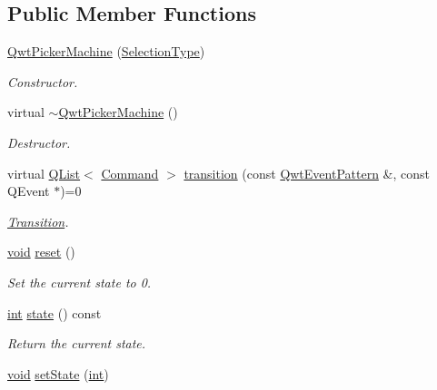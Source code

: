 \subsection*{Public Member Functions}
\begin{DoxyCompactItemize}
\item 
\hyperlink{class_qwt_picker_machine_ab27bc3f70d48aa145db9ebbfdba34e15}{Qwt\-Picker\-Machine} (\hyperlink{class_qwt_picker_machine_a24a9faf12cfa5746eee839a2c0bb937d}{Selection\-Type})
\begin{DoxyCompactList}\small\item\em Constructor. \end{DoxyCompactList}\item 
virtual \hyperlink{class_qwt_picker_machine_aa1164dfb8ae6ac62fb3b6cb19efcb3e5}{$\sim$\-Qwt\-Picker\-Machine} ()
\begin{DoxyCompactList}\small\item\em Destructor. \end{DoxyCompactList}\item 
virtual \hyperlink{class_q_list}{Q\-List}$<$ \hyperlink{class_qwt_picker_machine_a3a8d3d4c107ce5f8351e4cbdd38c43f7}{Command} $>$ \hyperlink{class_qwt_picker_machine_acf7b57003bec437ce1ecf83e6d544968}{transition} (const \hyperlink{class_qwt_event_pattern}{Qwt\-Event\-Pattern} \&, const Q\-Event $\ast$)=0
\begin{DoxyCompactList}\small\item\em \hyperlink{class_transition}{Transition}. \end{DoxyCompactList}\item 
\hyperlink{group___u_a_v_objects_plugin_ga444cf2ff3f0ecbe028adce838d373f5c}{void} \hyperlink{class_qwt_picker_machine_ace6daa55324a8daab3839cf8ba677a93}{reset} ()
\begin{DoxyCompactList}\small\item\em Set the current state to 0. \end{DoxyCompactList}\item 
\hyperlink{ioapi_8h_a787fa3cf048117ba7123753c1e74fcd6}{int} \hyperlink{class_qwt_picker_machine_a9060b1036ef5125968fc7030681d73c0}{state} () const 
\begin{DoxyCompactList}\small\item\em Return the current state. \end{DoxyCompactList}\item 
\hyperlink{group___u_a_v_objects_plugin_ga444cf2ff3f0ecbe028adce838d373f5c}{void} \hyperlink{class_qwt_picker_machine_a569c426543e4a6aa15c221eb7c4910f0}{set\-State} (\hyperlink{ioapi_8h_a787fa3cf048117ba7123753c1e74fcd6}{int})

\end{DoxyCompactItemize}
